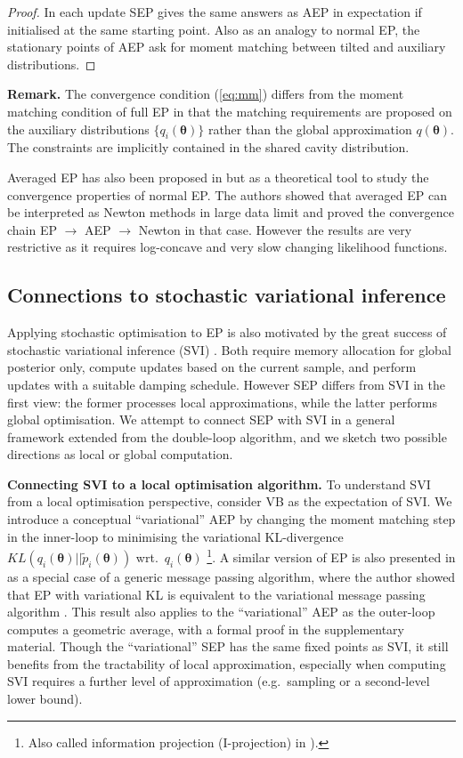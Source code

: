 \begin{proof}
In each update SEP gives the same answers as AEP in expectation if initialised at the same starting point. Also as an analogy to normal EP, the stationary points of AEP ask for moment matching between tilted and auxiliary distributions. 
\end{proof}
\textbf{Remark.} The convergence condition (\ref{eq:mm}) differs from the moment matching condition of full EP in that the matching requirements are proposed on the auxiliary distributions $\{q_i(\bm{\theta}) \}$ rather than the global approximation $q(\bm{\theta})$. The constraints are implicitly contained in the shared cavity distribution.

%
%
Averaged EP has also been proposed in \cite{barthelme:aep} but as a theoretical tool to study the convergence properties of normal EP. The authors showed that averaged EP can be interpreted as Newton methods in large data limit and proved the convergence chain EP $\rightarrow$ AEP $\rightarrow$ Newton in that case. However the results are very restrictive as it requires log-concave and very slow changing likelihood functions. 

\subsection{Connections to stochastic variational inference}
Applying stochastic optimisation to EP is also motivated by the great success of stochastic variational inference (SVI) \cite{hoffman:svi}. Both require memory allocation for global posterior only, compute updates based on the current sample, and perform updates with a suitable damping schedule. However SEP differs from SVI in the first view: the former processes local approximations, while the latter performs global optimisation. We attempt to connect SEP with SVI in a general framework extended from the double-loop algorithm, and we sketch two possible directions as local or global computation.

%
\textbf{Connecting SVI to a local optimisation algorithm.}
To understand SVI from a local optimisation perspective, consider VB as the expectation of SVI. We introduce a conceptual ``variational'' AEP by changing the moment matching step in the inner-loop to minimising the variational KL-divergence $KL(q_i(\bm{\theta}) || \tilde{p}_i(\bm{\theta}))$ wrt.~$q_i(\bm{\theta})$ \footnote{Also called information projection (I-projection) in \cite{amari:ig}).}. A similar version of EP is also presented in \cite{minka:divergence} as a special case of a generic message passing algorithm, where the author showed that EP with variational KL is equivalent to the variational message passing algorithm \cite{winn:vmp}. This result also applies to the ``variational'' AEP as the outer-loop computes a geometric average, with a formal proof in the supplementary material. Though the ``variational'' SEP has the same fixed points as SVI, it still benefits from the tractability of local approximation, especially when computing SVI requires a further level of approximation (e.g.~sampling or a second-level lower bound).

